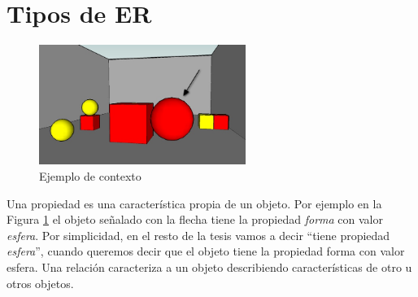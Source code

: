 

\section{Tipos de ER}
\label{sec:tipos_er}
\begin{figure}[ht]
\centering
\includegraphics[width=0.6\textwidth]{images/22sinletras.jpg}
\caption{Ejemplo de contexto}
\label{GRE3D7-stimulus}
\end{figure}

Una propiedad es una caracter\'istica propia de un objeto. Por ejemplo en la Figura \ref{GRE3D7-stimulus} el objeto se\~nalado con la flecha tiene la propiedad {\it forma} con valor {\it esfera}. Por simplicidad, en el resto de la tesis vamos a decir ``tiene propiedad {\it esfera}'', cuando queremos decir que el objeto tiene la propiedad forma con valor esfera. Una relaci\'on caracteriza a un objeto describiendo caracter\'isticas de otro u otros objetos.

